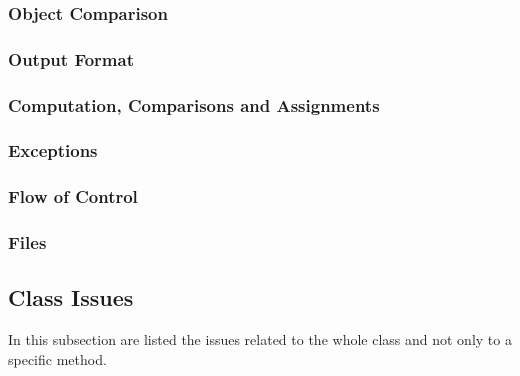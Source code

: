 \subsubsection{Object Comparison}
\begin{itemize}
\end{itemize}

\subsubsection{Output Format}
\begin{itemize}
\end{itemize}

\subsubsection{Computation, Comparisons and Assignments}
\begin{itemize}
\end{itemize}

\subsubsection{Exceptions}
\begin{itemize}
\end{itemize}

\subsubsection{Flow of Control}
\begin{itemize}
\end{itemize}

\subsubsection{Files}
\begin{itemize}
\end{itemize}

\subsection{Class Issues}
In this subsection are listed the issues related to the whole class and not only to a specific method.
